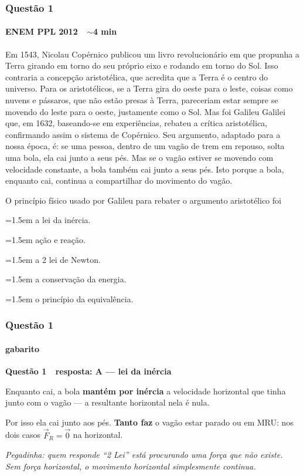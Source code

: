 \documentclass[aspectratio=169,12pt]{beamer}
\newcommand{\optitem}[2]{%
  \par\hangindent=1.5em\hangafter=1
  \makebox[1.5em][l]{\textbf{#1)}}#2}
\newcommand{\alternativascols}[5]{%
  \par\vspace{0.5em}%
  \begingroup\setlength{\parskip}{0.28em}%
  \noindent
  \begin{minipage}[t]{0.48\textwidth}
    \optitem{a}{#1}\optitem{b}{#2}\optitem{c}{#3}
  \end{minipage}\hfill
  \begin{minipage}[t]{0.48\textwidth}
    \optitem{d}{#4}\optitem{e}{#5}
  \end{minipage}%
  \par\endgroup}
\newcommand{\resposta}[2]{%
  \par\vspace{0.2em}
  {\Large\bfseries\color{vinho}Quest\~ao #1 \,\textemdash\, resposta: #2}
  \par\vspace{0.6em}}
\begin{document}
\begin{frame}
\frametitle{Quest\~ao 1}
\framesubtitle{ENEM PPL 2012 \,\textperiodcentered\, $\sim$4 min}

\footnotesize\linespread{0.97}\selectfont
Em 1543, Nicolau Cop\'ernico publicou um livro revolucion\'ario em que
propunha a Terra girando em torno do seu pr\'oprio eixo e rodando em
torno do Sol. Isso contraria a concep\c{c}\~ao aristot\'elica, que
acredita que a Terra \'e o centro do universo. Para os aristot\'elicos,
se a Terra gira do oeste para o leste, coisas como nuvens e p\'assaros,
que n\~ao est\~ao presas \`a Terra, pareceriam estar sempre se movendo
do leste para o oeste, justamente como o Sol. Mas foi Galileu Galilei
que, em 1632, baseando-se em experi\^encias, rebateu a cr\'itica
aristot\'elica, confirmando assim o sistema de Cop\'ernico. Seu
argumento, adaptado para a nossa \'epoca, \'e: se uma pessoa,
dentro de um vag\~ao de trem em repouso, solta uma bola, ela cai junto
a seus p\'es. Mas se o vag\~ao estiver se movendo com velocidade
constante, a bola tamb\'em cai junto a seus p\'es. Isto porque a bola,
enquanto cai, continua a compartilhar do movimento do vag\~ao.

\vspace{0.2em}
\small
O princ\'ipio f\'isico usado por Galileu para rebater o argumento
aristot\'elico foi

\alternativascols{a lei da in\'ercia.}{a\c{c}\~ao e rea\c{c}\~ao.}%
{a 2\textordfeminine{} lei de Newton.}{a conserva\c{c}\~ao da energia.}%
{o princ\'ipio da equival\^encia.}
\end{frame}

\begin{frame}
\frametitle{Quest\~ao 1}
\framesubtitle{gabarito}
\resposta{1}{A --- lei da in\'ercia}

Enquanto cai, a bola \textbf{mant\'em por in\'ercia} a velocidade
horizontal que tinha junto com o vag\~ao --- a resultante horizontal
nela \'e nula.

\vspace{0.2em}
Por isso ela cai junto aos p\'es. \textbf{Tanto faz} o vag\~ao estar
parado ou em MRU: nos dois casos $\vec{F}_R = \vec{0}$ na horizontal.

\vspace{0.9em}
{\color{grafite}\itshape Pegadinha: quem responde ``2\textordfeminine{}
Lei'' est\'a procurando uma for\c{c}a que n\~ao existe. Sem for\c{c}a
horizontal, o movimento horizontal simplesmente continua.}
\end{frame}
\end{document}
